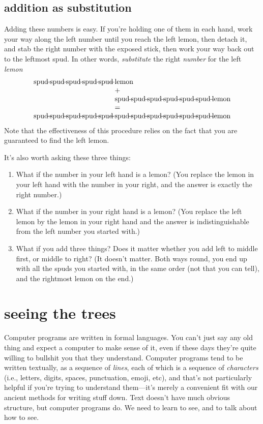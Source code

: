 \documentclass{book}
\begin{document}
\section{addition as substitution}

Adding these numbers is easy. If you're holding one of them in each hand, work your way along the left number until you reach the left lemon, then detach it, and stab the right number with the exposed stick, then work your way back out to the leftmost spud. In other words, \emph{substitute} the right \emph{number} for the left \emph{lemon}
\[\begin{array}{l@{\;\,}l}
\spud\spud\spud\spud\spud&\lemon\\
&+ \\
&\spud\spud\spud\spud\spud\spud\lemon\\
&= \\
\spud\spud\spud\spud\spud&\spud\spud\spud\spud\spud\spud\lemon\\
\end{array}
\]
Note that the effectiveness of this procedure relies on the fact that you are guaranteed to find the left lemon.

It's also worth asking these three things:
\begin{enumerate}
\item What if the number in your left hand is a lemon? (You replace the lemon in your left hand with the number in your right, and the answer is exactly the right number.)
\item What if the number in your right hand is a lemon? (You replace the left lemon by the lemon in your right hand and the answer is indistinguishable from the left number you started with.)
\item What if you add three things? Does it matter whether you add left to middle first, or middle to right? (It doesn't matter. Both ways round, you end up with all the spuds you started with, in the same order (not that you can tell), and the rightmost lemon on the end.)
\end{enumerate}


\chapter{seeing the trees}

Computer programs are written in formal languages. You can't just say any old thing and expect a computer to make sense of it, even if these days they're quite willing to bullshit you that they understand. Computer programs tend to be written textually, as a sequence of \emph{lines}, each of which is a sequence of \emph{characters} (i.e., letters, digits, spaces, punctuation, emoji, etc), and that's not particularly helpful if you're trying to understand them---it's merely a convenient fit with our ancient methods for writing stuff down. Text doesn't have much obvious structure, but computer programs do. We need to learn to see, and to talk about how to see.
\end{document}
